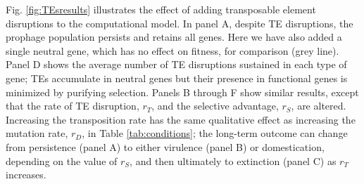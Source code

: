  
 Fig. \ref{fig:TEsresults} illustrates the effect of adding transposable element disruptions to the computational model. In panel A, despite TE disruptions, the prophage population persists and retains all genes.  Here we have also added a single neutral gene, which has no effect on fitness, for comparison (grey line).  Panel D shows the average number of TE disruptions sustained in each type of gene; TEs accumulate in neutral genes but their presence in functional genes is minimized by purifying selection.  Panels B through F show similar results, except that the rate of TE disruption, $r_T$, and the selective advantage, $r_S$, are altered.  Increasing the transposition rate has the same qualitative effect as increasing the mutation rate, $r_D$, in Table \ref{tab:conditions}; the long-term outcome can change  from persistence (panel A) to either virulence (panel B) or domestication, depending on the value of $r_S$, and then ultimately to extinction (panel C) as $r_T$ increases.
 
